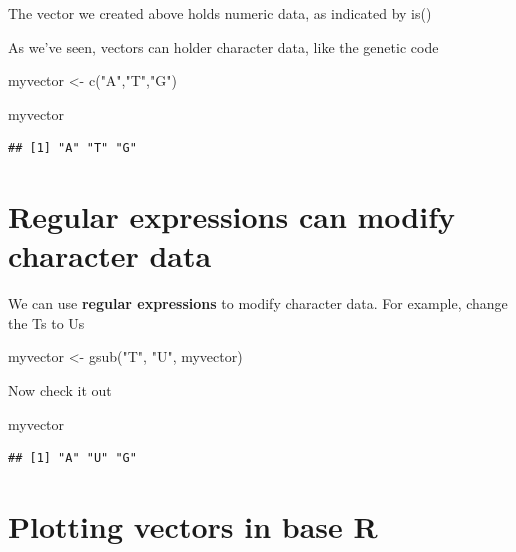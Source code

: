 \documentclass[
]{book}
\newenvironment{Shaded}{\begin{snugshade}}{\end{snugshade}}
\newcommand{\FunctionTok}[1]{\textcolor[rgb]{0.00,0.00,0.00}{#1}}
\newcommand{\NormalTok}[1]{#1}
\newcommand{\OtherTok}[1]{\textcolor[rgb]{0.56,0.35,0.01}{#1}}
\newcommand{\StringTok}[1]{\textcolor[rgb]{0.31,0.60,0.02}{#1}}
\begin{document}
The vector we created above holds numeric data, as indicated by is()

As we've seen, vectors can holder character data, like the genetic code

\begin{Shaded}
\begin{Highlighting}[]
\NormalTok{myvector }\OtherTok{\textless{}{-}} \FunctionTok{c}\NormalTok{(}\StringTok{"A"}\NormalTok{,}\StringTok{"T"}\NormalTok{,}\StringTok{"G"}\NormalTok{)}

\NormalTok{myvector}
\end{Highlighting}
\end{Shaded}

\begin{verbatim}
## [1] "A" "T" "G"
\end{verbatim}

\hypertarget{regular-expressions-can-modify-character-data}{%
\section{Regular expressions can modify character data}\label{regular-expressions-can-modify-character-data}}

We can use \textbf{regular expressions} to modify character data. For example, change the Ts to Us

\begin{Shaded}
\begin{Highlighting}[]
\NormalTok{myvector }\OtherTok{\textless{}{-}} \FunctionTok{gsub}\NormalTok{(}\StringTok{"T"}\NormalTok{, }\StringTok{"U"}\NormalTok{, myvector)}
\end{Highlighting}
\end{Shaded}

Now check it out

\begin{Shaded}
\begin{Highlighting}[]
\NormalTok{myvector}
\end{Highlighting}
\end{Shaded}

\begin{verbatim}
## [1] "A" "U" "G"
\end{verbatim}

\hypertarget{plotting-vectors-in-base-r}{%
\section{Plotting vectors in base R}\label{plotting-vectors-in-base-r}}
\end{document}
